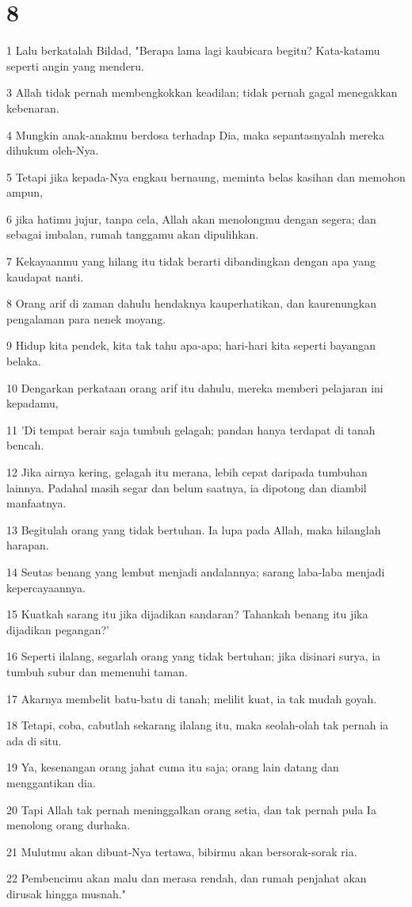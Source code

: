 \chapter{8}

\par 1 Lalu berkatalah Bildad, "Berapa lama lagi kaubicara begitu? Kata-katamu seperti angin yang menderu.
\par 3 Allah tidak pernah membengkokkan keadilan; tidak pernah gagal menegakkan kebenaran.
\par 4 Mungkin anak-anakmu berdosa terhadap Dia, maka sepantasnyalah mereka dihukum oleh-Nya.
\par 5 Tetapi jika kepada-Nya engkau bernaung, meminta belas kasihan dan memohon ampun,
\par 6 jika hatimu jujur, tanpa cela, Allah akan menolongmu dengan segera; dan sebagai imbalan, rumah tanggamu akan dipulihkan.
\par 7 Kekayaanmu yang hilang itu tidak berarti dibandingkan dengan apa yang kaudapat nanti.
\par 8 Orang arif di zaman dahulu hendaknya kauperhatikan, dan kaurenungkan pengalaman para nenek moyang.
\par 9 Hidup kita pendek, kita tak tahu apa-apa; hari-hari kita seperti bayangan belaka.
\par 10 Dengarkan perkataan orang arif itu dahulu, mereka memberi pelajaran ini kepadamu,
\par 11 'Di tempat berair saja tumbuh gelagah; pandan hanya terdapat di tanah bencah.
\par 12 Jika airnya kering, gelagah itu merana, lebih cepat daripada tumbuhan lainnya. Padahal masih segar dan belum saatnya, ia dipotong dan diambil manfaatnya.
\par 13 Begitulah orang yang tidak bertuhan. Ia lupa pada Allah, maka hilanglah harapan.
\par 14 Seutas benang yang lembut menjadi andalannya; sarang laba-laba menjadi kepercayaannya.
\par 15 Kuatkah sarang itu jika dijadikan sandaran? Tahankah benang itu jika dijadikan pegangan?'
\par 16 Seperti ilalang, segarlah orang yang tidak bertuhan; jika disinari surya, ia tumbuh subur dan memenuhi taman.
\par 17 Akarnya membelit batu-batu di tanah; melilit kuat, ia tak mudah goyah.
\par 18 Tetapi, coba, cabutlah sekarang ilalang itu, maka seolah-olah tak pernah ia ada di situ.
\par 19 Ya, kesenangan orang jahat cuma itu saja; orang lain datang dan menggantikan dia.
\par 20 Tapi Allah tak pernah meninggalkan orang setia, dan tak pernah pula Ia menolong orang durhaka.
\par 21 Mulutmu akan dibuat-Nya tertawa, bibirmu akan bersorak-sorak ria.
\par 22 Pembencimu akan malu dan merasa rendah, dan rumah penjahat akan dirusak hingga musnah."


